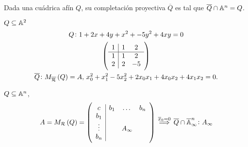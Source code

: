 \begin{obs}
  Dada una cuádrica afín $Q$, su completación proyectiva $\overline{Q}$
  es tal que $\overline{Q} \cap \mathbb{A}^n = Q$.
\end{obs}

\begin{example}
  $Q \subseteq \mathbb{A}^2$ \\
  \begin{gather*}
    Q \colon 1+2x+4y+x^2+-5y^2+4xy = 0 \\ \left(
    \begin{array}{c|cc}
      1 & 1 & 2 \\ \hline
      1 & 1 & 2 \\
      2 & 2 & -5
    \end{array}\right) \\
    \overline{Q} \colon M_{\overline{\mathcal{R}}}\left( Q \right) = A, \, x_0^2+x_1^2-5x_2^2 + 2x_0x_1 + 4x_0x_2 + 4x_1x_2 = 0.
  \end{gather*}
\end{example}
\begin{obs}
  $Q \subseteq \mathbb{A}^n$,
  \[
    A = M_{\mathcal{R}}\left( Q \right) =
    \left( \begin{array}{c|ccc}
      c & b_1 & \dots & b_n \\
      b_1 & & & \\
      \vdots & & A_\infty & \\
      b_n & & &
    \end{array} \right)
    \stackrel{\overline{x}_0 = 0}{\implies} \overline{Q} \cap \overline{\mathbb{A}}^n_\infty \colon A_\infty
  \]
\end{obs}
